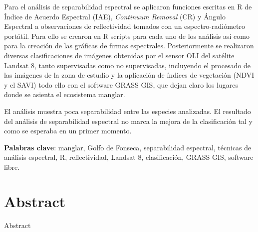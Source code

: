 Para el análisis de separabilidad espectral se aplicaron funciones escritas en R de Índice de Acuerdo Espectral (IAE), \textit{Continuum Removal} (CR) y Ángulo Espectral a observaciones de reflectividad tomados con un espectro-radiómetro portátil. Para ello se crearon en R scripts para cada uno de los análisis así como para la creación de las gráficas de firmas espectrales. Posteriormente se realizaron diversas clasificaciones de imágenes obtenidas por el sensor OLI del satélite Landsat 8, tanto supervisadas como no supervisadas, incluyendo el procesado de las imágenes de la zona de estudio y la aplicación de índices de vegetación (NDVI y el SAVI) todo ello con el software GRASS GIS, que dejan claro los lugares donde se asienta el ecosistema manglar.

El análisis muestra poca separabilidad entre las especies analizadas. El resultado del análisis de separabilidad espectral no marca la mejora de la clasificación tal y como se esperaba en un primer momento.

\noindent\textbf{Palabras clave}: manglar, Golfo de Fonseca, separabilidad espectral, técnicas de análisis espectral, R, reflectividad, Landsat 8, clasificación, GRASS GIS, software libre.

\section*{Abstract}
Abstract